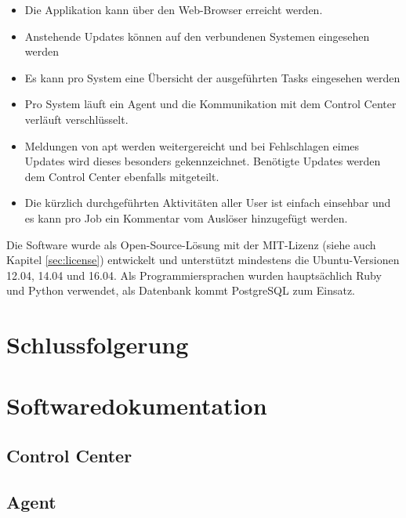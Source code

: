 \begin{itemize}
    \item Die Applikation kann über den Web-Browser erreicht werden.
    \item Anstehende Updates können auf den verbundenen Systemen eingesehen werden
    \item Es kann pro System eine Übersicht der ausgeführten Tasks eingesehen werden
    \item Pro System läuft ein Agent und die Kommunikation mit dem Control Center verläuft verschlüsselt.
    \item Meldungen von {apt} werden weitergereicht und bei Fehlschlagen eimes Updates wird dieses besonders gekennzeichnet. Benötigte Updates werden dem Control Center ebenfalls mitgeteilt.
    \item Die kürzlich durchgeführten Aktivitäten aller User ist einfach einsehbar und es kann pro Job ein Kommentar vom Auslöser hinzugefügt werden.
\end{itemize}


Die Software wurde als Open-Source-Lösung mit der MIT-Lizenz (siehe auch Kapitel \ref{sec:license}) entwickelt und unterstützt mindestens die Ubuntu-Versionen 12.04, 14.04 und 16.04. Als Programmiersprachen wurden hauptsächlich Ruby und Python verwendet, als Datenbank kommt PostgreSQL zum Einsatz.

\section{Schlussfolgerung}
\xxx

\section{Softwaredokumentation}

\subsection*{Control Center}



\subsection*{Agent}


